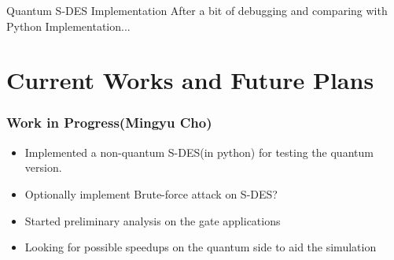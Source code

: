 \documentclass{beamer}
\begin{document}
       
   	\begin{frame}{Quantum S-DES Implementation}
        After a bit of debugging and comparing with Python Implementation...
   	\end{frame} 
     
    
	\section{Current Works and Future Plans}
	
	\begin{frame}
		\frametitle{Work in Progress(Mingyu Cho)}
		\begin{itemize}
			\item Implemented a non-quantum S-DES(in python) for testing the quantum version.
			\item Optionally implement Brute-force attack on S-DES?
			\item Started preliminary analysis on the gate applications
			\item Looking for possible speedups on the quantum side to aid the simulation
		\end{itemize}
	\end{frame}
	
\end{document}
